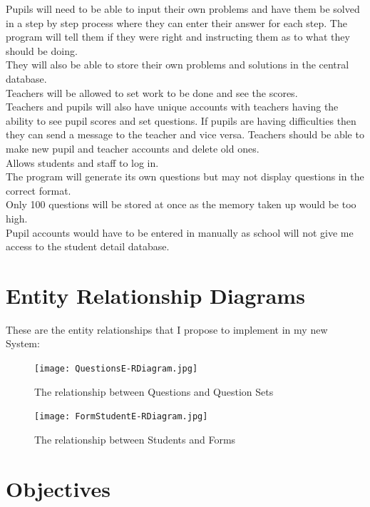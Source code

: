 \documentclass[a4paper,12pt]{report}
\begin{document}
Pupils will need to be able to input their own problems and have them be solved in a step by step process where they can enter their answer for each step. The program will tell them if they were right and instructing them as to what they should be doing.\\
 They will also be able to store their own problems and solutions in the central database.\\
 Teachers will be allowed to set work to be done and see the scores.\\
 Teachers and pupils will also have unique accounts with teachers having the ability to see pupil scores and set questions. If pupils are having difficulties then they can send a message to the teacher and vice versa. Teachers should be able to make new pupil and teacher accounts and delete old ones.\\
 Allows students and staff to log in.\\
 The program will generate its own questions but may not display questions in the correct format.\\
 Only 100 questions will be stored at once as the memory taken up would be too high.\\
 Pupil accounts would have to be entered in manually as school will not give me access to the student detail database.\\
\section{Entity Relationship Diagrams}
\FloatBarrier
These are the entity relationships that I propose to implement in my new System:
\begin{figure}[h!]
\centering
\texttt{[image: QuestionsE-RDiagram.jpg]}
\caption{The relationship between Questions and Question Sets}
\label{fig:ERQS}
\end{figure}

\begin{figure}[h!]
\centering
\texttt{[image: FormStudentE-RDiagram.jpg]}
\caption{The relationship between Students and Forms}
\label{fig:ERFS}
\end{figure}
\FloatBarrier
\section{Objectives}
\end{document}
